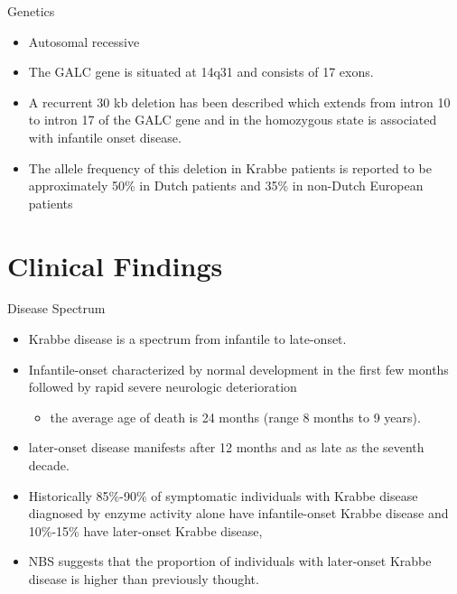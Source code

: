 \documentclass[presentation, smaller]{beamer}
\begin{document}
\begin{frame}[label={sec:org694ab0e}]{Genetics}
\begin{itemize}
\item Autosomal recessive
\item The GALC gene is situated at 14q31 and consists of 17 exons.
\item A recurrent 30 kb deletion has been described which extends from
intron 10 to intron 17 of the GALC gene and in the homozygous state
is associated with infantile onset disease.
\item The allele frequency of this deletion in Krabbe patients is reported
to be approximately 50\% in Dutch patients and 35\% in non-Dutch
European patients
\end{itemize}
\end{frame}

\section{Clinical Findings}
\label{sec:org59b7aaf}
\begin{frame}[label={sec:orgefb75f1}]{Disease Spectrum}
\begin{itemize}
\item Krabbe disease is a spectrum from infantile to late-onset.

\item Infantile-onset characterized by normal development in the first few
months followed by rapid severe neurologic deterioration
\begin{itemize}
\item the average age of death is 24 months (range 8 months to 9 years).
\end{itemize}

\item later-onset disease manifests after 12 months and as late as the
seventh decade.

\item Historically 85\%-90\% of symptomatic individuals with Krabbe disease
diagnosed by enzyme activity alone have infantile-onset Krabbe
disease and 10\%-15\% have later-onset Krabbe disease,

\item NBS suggests that the proportion of individuals with later-onset
Krabbe disease is higher than previously thought.
\end{itemize}
\end{frame}
\end{document}
